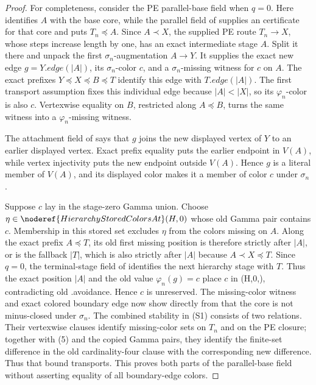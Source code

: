 \begin{proof}
For completeness, consider the PE parallel-base field when \(q=0\).
Here  identifies \(A\) with the base core,
while the parallel field of  supplies an
 certificate for that core and puts
\(T_n\preccurlyeq A\).  Since \(A\prec X\), the supplied PE route
\(T_n\to X\), whose  steps increase length
by one, has an exact intermediate stage \(A\).  Split it there and unpack
the first \(\sigma_n\)-augmentation \(A\to Y\).  It supplies the exact
new edge \(g=Y.\mathit{edge}(|A|)\), its \(\sigma_n\)-color \(c\), and a
\(\sigma_n\)-missing witness for \(c\) on \(A\).  The exact prefixes
\(Y\preccurlyeq X\preccurlyeq B\preccurlyeq T\) identify this edge with
\(T.\mathit{edge}(|A|)\).  The first transport assumption fixes this
individual edge because \(|A|<|X|\), so its \(\varphi_n\)-color is also
\(c\).  Vertexwise equality on \(B\), restricted along
\(A\preccurlyeq B\), turns the same witness into a
\(\varphi_n\)-missing witness.

The attachment field of  says that \(g\) joins the
new displayed vertex of \(Y\) to an earlier displayed vertex.  Exact
prefix equality puts the earlier endpoint in \(V(A)\), while vertex
injectivity puts the new endpoint outside \(V(A)\).  Hence \(g\) is a
literal  member of \(V(A)\), and its displayed
color makes it a  member of color \(c\)
under \(\sigma_n\).

Suppose \(c\) lay in the stage-zero Gamma union.  Choose
\(\eta\in\noderef{HierarchyStoredColorsAt}(H,0)\) whose old Gamma pair
contains \(c\).  Membership in this stored set excludes \(\eta\) from
the colors missing on \(A\).  Along the exact prefix
\(A\preccurlyeq T\), its old first missing position is therefore
strictly after \(|A|\), or is the fallback \(|T|\), which is also
strictly after \(|A|\) because \(A\prec X\preccurlyeq T\).  Since
\(q=0\), the terminal-stage field of 
identifies the next hierarchy stage with \(T\).  Thus the exact position
\(|A|\) and the old value \(\varphi_n(g)=c\) place \(c\) in
(H,0,\eta)\), contradicting old
.avoidance.  Hence \(c\) is unreserved.  The
missing-color witness and exact colored boundary edge now show directly
from  that the core is not minus-closed
under \(\sigma_n\).
The combined stability in (S1) consists of two
 relations.  Their vertexwise clauses identify
missing-color sets on \(T_n\) and on the PE closure; together with (5)
and the copied Gamma pairs, they identify the finite-set difference in
the old cardinality-four clause with the corresponding new difference.
Thus that bound transports.  This proves both parts of the parallel-base
field without asserting equality of all boundary-edge colors.


\end{proof}
